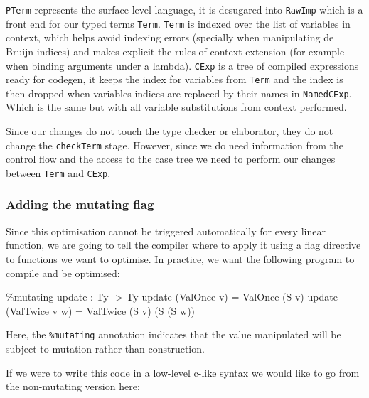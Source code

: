\documentclass[
]{article}
\newenvironment{Shaded}{}{}
\newcommand{\DataTypeTok}[1]{\textcolor[rgb]{0.56,0.13,0.00}{#1}}
\newcommand{\NormalTok}[1]{#1}
\newcommand{\OperatorTok}[1]{\textcolor[rgb]{0.40,0.40,0.40}{#1}}
\newcommand{\OtherTok}[1]{\textcolor[rgb]{0.00,0.44,0.13}{#1}}
\begin{document}
\texttt{PTerm} represents the surface level language, it is desugared
into \texttt{RawImp} which is a front end for our typed terms
\texttt{Term}. \texttt{Term} is indexed over the list of variables in
context, which helps avoid indexing errors (specially when manipulating
de Bruijn indices) and makes explicit the rules of context extension
(for example when binding arguments under a lambda). \texttt{CExp} is a
tree of compiled expressions ready for codegen, it keeps the index for
variables from \texttt{Term} and the index is then dropped when
variables indices are replaced by their names in \texttt{NamedCExp}.
Which is the same but with all variable substitutions from context
performed.

Since our changes do not touch the type checker or elaborator, they do
not change the \texttt{checkTerm} stage. However, since we do need
information from the control flow and the access to the case tree we
need to perform our changes between \texttt{Term} and \texttt{CExp}.

\hypertarget{adding-the-mutating-flag}{%
\subsubsection{Adding the mutating
flag}\label{adding-the-mutating-flag}}

Since this optimisation cannot be triggered automatically for every
linear function, we are going to tell the compiler where to apply it
using a flag directive to functions we want to optimise. In practice, we
want the following program to compile and be optimised:

\begin{Shaded}
\begin{Highlighting}[]
\OperatorTok{\%}\NormalTok{mutating}
\NormalTok{update }\OperatorTok{:} \DataTypeTok{Ty} \OtherTok{{-}\textgreater{}} \DataTypeTok{Ty}
\NormalTok{update (}\DataTypeTok{ValOnce}\NormalTok{ v) }\OtherTok{=} \DataTypeTok{ValOnce}\NormalTok{ (}\DataTypeTok{S}\NormalTok{ v)}
\NormalTok{update (}\DataTypeTok{ValTwice}\NormalTok{ v w) }\OtherTok{=} \DataTypeTok{ValTwice}\NormalTok{ (}\DataTypeTok{S}\NormalTok{ v) (}\DataTypeTok{S}\NormalTok{ (}\DataTypeTok{S}\NormalTok{ w))}
\end{Highlighting}
\end{Shaded}

Here, the \texttt{\%mutating} annotation indicates that the value
manipulated will be subject to mutation rather than construction.

If we were to write this code in a low-level c-like syntax we would like
to go from the non-mutating version here:
\end{document}
